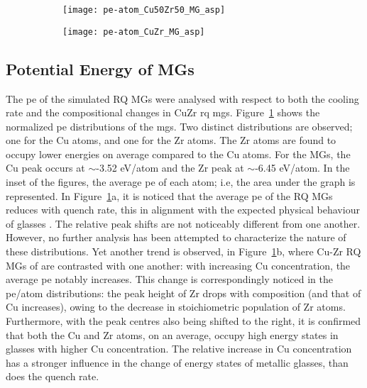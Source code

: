 \begin{figure} %
	\centering
	\begin{subfigure}{\linewidth} \centering
		\texttt{[image: pe-atom\_Cu50Zr50\_MG\_asp]}
	\end{subfigure}%
	\vfill
	\begin{subfigure}{\linewidth} \centering
		\texttt{[image: pe-atom\_CuZr\_MG\_asp]}
	\end{subfigure}	
	\label{f:pe_mgs}
\end{figure}

\subsection{Potential Energy of MGs}  \label{s:pe-mgs}
The \gls{pe} of the simulated RQ MGs were analysed with respect to both the cooling rate and the compositional changes in CuZr \gls{rq} \gls{mg}s. Figure~\ref{f:pe_mgs} shows the normalized \gls{pe} distributions of the \gls{mg}s. Two distinct distributions are observed; one for the Cu atoms, and one for the Zr atoms. The Zr atoms are found to occupy lower energies on average compared to the Cu atoms. For the \cz  {} MGs, the Cu peak occurs at $\sim$-3.52 eV/atom and the Zr peak at $\sim$-6.45 eV/atom. In the inset of the figures, the average \gls{pe} of each atom; i.e, the area under the graph is represented. In Figure~\ref{f:pe_mgs}a, it is noticed that the average \gls{pe} of the RQ MGs reduces with quench rate, this in alignment with the expected physical behaviour of glasses \cite{Yue2018,Berthier2016}. The relative peak shifts are not noticeably different from one another. However, no further analysis has been attempted to characterize the nature of these distributions. Yet another trend is observed, in Figure~\ref{f:pe_mgs}b, where Cu-Zr RQ MGs of  are contrasted with one another: with increasing Cu concentration, the average \gls{pe} notably increases. This change is correspondingly noticed in the \gls{pe}/atom distributions: the peak height of Zr drops with composition (and that of Cu increases), owing to the decrease in stoichiometric population of Zr atoms. Furthermore, with the peak centres also being shifted to the right, it is confirmed that both the Cu and Zr atoms, on an average, occupy high energy states in glasses with higher Cu concentration. The relative increase in Cu concentration has a stronger influence in the change of energy states of metallic glasses, than does the quench rate. \par

